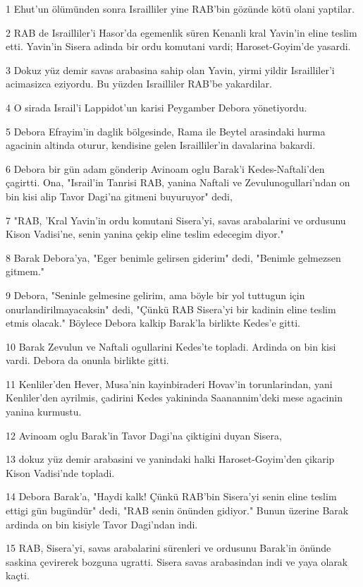 \par 1 Ehut'un ölümünden sonra Israilliler yine RAB'bin gözünde kötü olani yaptilar.
\par 2 RAB de Israilliler'i Hasor'da egemenlik süren Kenanli kral Yavin'in eline teslim etti. Yavin'in Sisera adinda bir ordu komutani vardi; Haroset-Goyim'de yasardi.
\par 3 Dokuz yüz demir savas arabasina sahip olan Yavin, yirmi yildir Israilliler'i acimasizca eziyordu. Bu yüzden Israilliler RAB'be yakardilar.
\par 4 O sirada Israil'i Lappidot'un karisi Peygamber Debora yönetiyordu.
\par 5 Debora Efrayim'in daglik bölgesinde, Rama ile Beytel arasindaki hurma agacinin altinda oturur, kendisine gelen Israilliler'in davalarina bakardi.
\par 6 Debora bir gün adam gönderip Avinoam oglu Barak'i Kedes-Naftali'den çagirtti. Ona, "Israil'in Tanrisi RAB, yanina Naftali ve Zevulunogullari'ndan on bin kisi alip Tavor Dagi'na gitmeni buyuruyor" dedi,
\par 7 "RAB, 'Kral Yavin'in ordu komutani Sisera'yi, savas arabalarini ve ordusunu Kison Vadisi'ne, senin yanina çekip eline teslim edecegim diyor."
\par 8 Barak Debora'ya, "Eger benimle gelirsen giderim" dedi, "Benimle gelmezsen gitmem."
\par 9 Debora, "Seninle gelmesine gelirim, ama böyle bir yol tuttugun için onurlandirilmayacaksin" dedi, "Çünkü RAB Sisera'yi bir kadinin eline teslim etmis olacak." Böylece Debora kalkip Barak'la birlikte Kedes'e gitti.
\par 10 Barak Zevulun ve Naftali ogullarini Kedes'te topladi. Ardinda on bin kisi vardi. Debora da onunla birlikte gitti.
\par 11 Kenliler'den Hever, Musa'nin kayinbiraderi Hovav'in torunlarindan, yani Kenliler'den ayrilmis, çadirini Kedes yakininda Saanannim'deki mese agacinin yanina kurmustu.
\par 12 Avinoam oglu Barak'in Tavor Dagi'na çiktigini duyan Sisera,
\par 13 dokuz yüz demir arabasini ve yanindaki halki Haroset-Goyim'den çikarip Kison Vadisi'nde topladi.
\par 14 Debora Barak'a, "Haydi kalk! Çünkü RAB'bin Sisera'yi senin eline teslim ettigi gün bugündür" dedi, "RAB senin önünden gidiyor." Bunun üzerine Barak ardinda on bin kisiyle Tavor Dagi'ndan indi.
\par 15 RAB, Sisera'yi, savas arabalarini sürenleri ve ordusunu Barak'in önünde saskina çevirerek bozguna ugratti. Sisera savas arabasindan indi ve yaya olarak kaçti.
